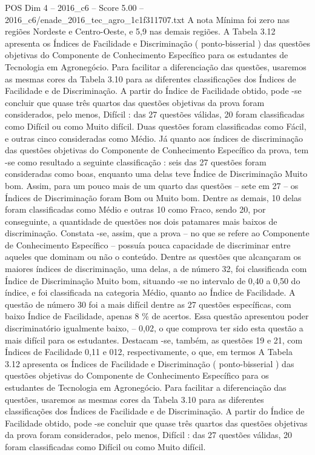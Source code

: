 \begin{textsample}{POS Dim 4 – 2016\_c6 – Score 5.00 – 2016\_c6/enade\_2016\_tec\_agro\_1c1f311707.txt}
A nota Mínima foi zero nas regiões Nordeste e Centro-Oeste, e 5,9 nas demais regiões.
A Tabela 3.12 apresenta os Índices de Facilidade e Discriminação ( ponto-bisserial ) das questões objetivas do Componente de Conhecimento Específico para os estudantes de Tecnologia em Agronegócio.
Para facilitar a diferenciação das questões, usaremos as mesmas cores da Tabela 3.10 para as diferentes classificações dos Índices de Facilidade e de Discriminação.
A partir do Índice de Facilidade obtido, pode -se concluir que quase três quartos das questões objetivas da prova foram considerados, pelo menos, Difícil : das 27 questões válidas, 20 foram classificadas como Difícil ou como Muito difícil.
Duas questões foram classificadas como Fácil, e outras cinco consideradas como Médio.
Já quanto aos índices de discriminação das questões objetivas do Componente de Conhecimento Específico da prova, tem -se como resultado a seguinte classificação : seis das 27 questões foram consideradas como boas, enquanto uma delas teve Índice de Discriminação Muito bom.
Assim, para um pouco mais de um quarto das questões – sete em 27 – os Índices de Discriminação foram Bom ou Muito bom.
Dentre as demais, 10 delas foram classificadas como Médio e outras 10 como Fraco, sendo 20, por conseguinte, a quantidade de questões nos dois patamares mais baixos de discriminação.
Constata -se, assim, que a prova – no que se refere ao Componente de Conhecimento Específico – possuía pouca capacidade de discriminar entre aqueles que dominam ou não o conteúdo.
Dentre as questões que alcançaram os maiores índices de discriminação, uma delas, a de número 32, foi classificada com Índice de Discriminação Muito bom, situando -se no intervalo de 0,40 a 0,50 do índice, e foi classificada na categoria Médio, quanto ao Índice de Facilidade.
A questão de número 30 foi a mais difícil dentre as 27 questões específicas, com baixo Índice de Facilidade, apenas 8 \% de acertos.
Essa questão apresentou poder discriminatório igualmente baixo, – 0,02, o que comprova ter sido esta questão a mais difícil para os estudantes.
Destacam -se, também, as questões 19 e 21, com Índices de Facilidade 0,11 e 012, respectivamente, o que, em termos A Tabela 3.12 apresenta os Índices de Facilidade e Discriminação ( ponto-bisserial ) das questões objetivas do Componente de Conhecimento Específico para os estudantes de Tecnologia em Agronegócio.
Para facilitar a diferenciação das questões, usaremos as mesmas cores da Tabela 3.10 para as diferentes classificações dos Índices de Facilidade e de Discriminação.
A partir do Índice de Facilidade obtido, pode -se concluir que quase três quartos das questões objetivas da prova foram considerados, pelo menos, Difícil : das 27 questões válidas, 20 foram classificadas como Difícil ou como Muito difícil.

\end{textsample}
